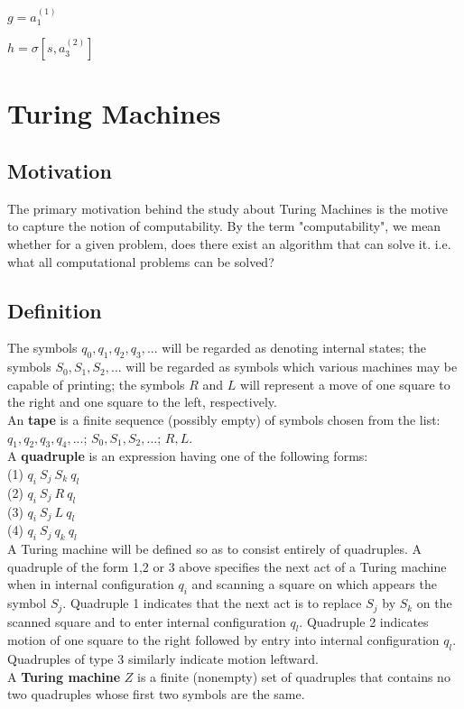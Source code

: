 $
g = a_1^{(1)}
$

$
h = \sigma [s, a_3^{(2)}]
$
\section{Turing Machines}
\subsection{Motivation}
The primary motivation behind the study about Turing Machines is the motive to capture the notion of computability. By the term "computability", we mean whether for a given problem, does there exist an algorithm that can solve it. i.e. what all computational problems can be solved?
\subsection{Definition}
The symbols $q_0,q_1,q_2,q_3,...$ will be regarded as denoting internal states; the symbols $S_0, S_1, S_2,...$ will be regarded as symbols which various machines may be capable of printing; the symbols $R$ and $L$ will represent a move of one square to the right and one square to the left, respectively.\\
An \textbf{tape} is a finite sequence (possibly empty) of symbols chosen from the list: $q_1,q_2,q_3,q_4,...$; $S_0, S_1, S_2,...$; $R, L$. \\
A \textbf{quadruple} is an expression having one of the following forms:\\
(1) $q_i\ S_j\ S_k\ q_l$\\
(2) $q_i\ S_j\ R\ q_l$\\
(3) $q_i\ S_j\ L\ q_l$\\
(4) $q_i\ S_j\ q_k\ q_l$\\
A Turing machine will be defined so as to consist entirely of quadruples. A quadruple of the form 1,2 or 3 above specifies the next act of a Turing machine when in internal configuration $q_i$ and scanning a square on which appears the symbol $S_j$. Quadruple 1 indicates that the next act is to replace $S_j$ by $S_k$ on the scanned square and to enter internal configuration $q_l$. Quadruple 2 indicates motion of one square to the right followed by entry into internal configuration $q_l$. Quadruples of type 3 similarly indicate motion leftward.\\
A \textbf{Turing machine} $Z$ is a finite (nonempty) set of quadruples that contains no two quadruples whose first two symbols are the same.\\
